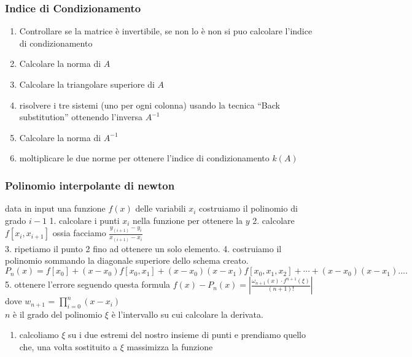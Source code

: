\documentclass[
]{article}
\author{}
\date{}
\providecommand{\tightlist}{%
  \setlength{\itemsep}{0pt}\setlength{\parskip}{0pt}}
\begin{document}
\subsubsection{\texorpdfstring{Indice di Condizionamento
}{Indice di Condizionamento }}\label{indice-di-condizionamento}

\begin{enumerate}
\def\labelenumi{\arabic{enumi}.}
\tightlist
\item
  Controllare se la matrice è invertibile, se non lo è non si puo
  calcolare l'indice di condizionamento
\item
  Calcolare la norma di \(A\)
\item
  Calcolare la triangolare superiore di \(A\)
\item
  risolvere i tre sistemi (uno per ogni colonna) usando la tecnica
  ``Back substitution'' ottenendo l'inversa \(A^{-1}\)
\item
  Calcolare la norma di \(A^{-1}\)
\item
  moltiplicare le due norme per ottenere l'indice di condizionamento
  \(k(A)\)
\end{enumerate}

\subsubsection{Polinomio interpolante di
newton}\label{polinomio-interpolante-di-newton}

data in input una funzione \(f(x)\) delle variabili \(x_{i}\) costruiamo
il polinomio di grado \(i-1\) 1. calcolare i punti \(x_{i}\) nella
funzione per ottenere la \(y\) 2. calcolare \(f[x_{i},x_{i+1}]\) ossia
facciamo \(\frac{y_{(i+1)} - y_{i}}{x_{(i+1)}-x_{i}}\)\\
3. ripetiamo il punto 2 fino ad ottenere un solo elemento. 4. costruiamo
il polinomio sommando la diagonale superiore dello schema creato.
\(P_{n}(x)=f[x_0]+(x-x_0)f[x_0,x_1]+(x-x_0)(x-x_1)f[x_0,x_1,x_2]+\cdots+(x-x_0)(x-x_1)....\)
5. ottenere l'errore seguendo questa formula
\(f(x) - P_{n}(x)= \left|\frac{\omega_{n+1}\left(x\right)\cdot f^{n+1}\left(\xi\right)}{\left(n+1\right)!}\right|\)
dove \(w_{n+1}\) = \(\prod_{i=0}^{n}(x-x_{i})\)\\
\(n\) è il grado del polinomio \(\xi\) è l'intervallo su cui calcolare
la derivata.

\begin{enumerate}
\def\labelenumi{\arabic{enumi}.}
\tightlist
\item
  calcoliamo \(\xi\) su i due estremi del nostro insieme di punti e
  prendiamo quello che, una volta sostituito a \(\xi\) massimizza la
  funzione
\end{enumerate}
\end{document}
